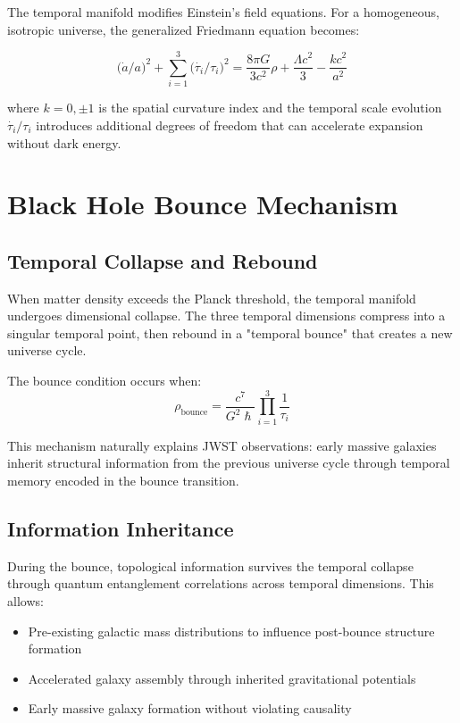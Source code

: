 \documentclass[reprint,amsmath,amssymb,aps,prd,nofootinbib]{revtex4-2}
\begin{document}
The temporal manifold modifies Einstein's field equations. For a homogeneous, isotropic universe, the generalized Friedmann equation becomes:

\begin{equation}
\bigl(\dot{a}/a\bigr)^2 + \sum_{i=1}^{3}\bigl(\dot{\tau_i}/\tau_i\bigr)^2 = \frac{8\pi G}{3c^2}\rho + \frac{\Lambda c^2}{3} - \frac{k c^2}{a^2}
\label{eq:modified_friedmann}
\end{equation}

where $k=0,\pm1$ is the spatial curvature index and the temporal scale evolution $\dot{\tau_i}/\tau_i$ introduces additional degrees of freedom that can accelerate expansion without dark energy.

\section{Black Hole Bounce Mechanism}\label{sec:bounce}

\subsection{Temporal Collapse and Rebound}

When matter density exceeds the Planck threshold, the temporal manifold undergoes dimensional collapse. The three temporal dimensions compress into a singular temporal point, then rebound in a "temporal bounce" that creates a new universe cycle.

The bounce condition occurs when:
\begin{equation}
\rho_{\text{bounce}} = \frac{c^7}{G^2\hslash} \prod_{i=1}^{3}\frac{1}{\tau_i}
\label{eq:bounce_condition}
\end{equation}

This mechanism naturally explains JWST observations: early massive galaxies inherit structural information from the previous universe cycle through temporal memory encoded in the bounce transition.

\subsection{Information Inheritance}

During the bounce, topological information survives the temporal collapse through quantum entanglement correlations across temporal dimensions. This allows:

\begin{itemize}
\item Pre-existing galactic mass distributions to influence post-bounce structure formation
\item Accelerated galaxy assembly through inherited gravitational potentials
\item Early massive galaxy formation without violating causality
\end{itemize}
\end{document}
